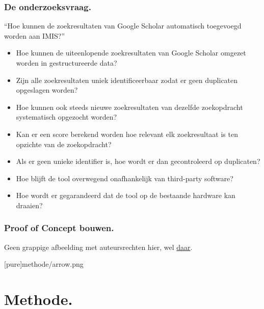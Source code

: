 \documentclass[aspectratio=169]{beamer}
\begin{document}
\begin{frame}
    \frametitle{De onderzoeksvraag.}
    \tiny
    \colorbox{hgorange}{``Hoe kunnen de zoekresultaten van Google Scholar automatisch toegevoegd worden aan IMIS?''}
    \begin{itemize}
        \item Hoe kunnen de uiteenlopende zoekresultaten van Google Scholar omgezet worden in gestructureerde data?
        \item Zijn alle zoekresultaten uniek identificeerbaar zodat er geen duplicaten opgeslagen worden?
    \end{itemize}
    \begin{itemize}
        \item Hoe kunnen ook steeds nieuwe zoekresultaten van dezelfde zoekopdracht systematisch opgezocht worden?
        \item Kan er een score berekend worden hoe relevant elk zoekresultaat is ten opzichte van de zoekopdracht?
        \item Als er geen unieke identifier is, hoe wordt er dan gecontroleerd op duplicaten? 
    \end{itemize}
    \begin{itemize}
        \item Hoe blijft de tool overwegend onafhankelijk van third-party software?
        \item Hoe wordt er gegarandeerd dat de tool op de bestaande hardware kan draaien? 
    \end{itemize}
    
    
\end{frame}

\begin{frame}
    \frametitle{Proof of Concept bouwen.}
    Geen grappige afbeelding met auteursrechten hier, wel \href{https://www.slideserve.com/zocha/agile-project-management}{daar}.
    
    
    
\end{frame}

{
    [pure]{methode/arrow.png}
\section{Methode.}
}
\end{document}
